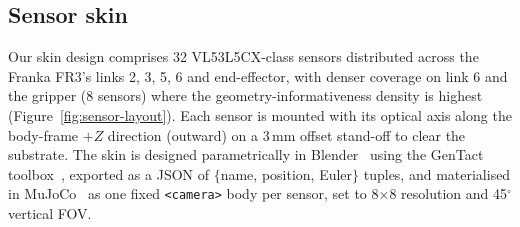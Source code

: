 \documentclass[11pt]{article}
\begin{document}
\subsection{Sensor skin}
\label{sec:system-skin}

Our skin design comprises 32 VL53L5CX-class sensors distributed across
the Franka FR3's links 2, 3, 5, 6 and end-effector, with denser coverage
on link 6 and the gripper (8 sensors) where the geometry-informativeness
density is highest (Figure~\ref{fig:sensor-layout}). Each sensor is
mounted with its optical axis along the body-frame $+Z$ direction
(outward) on a 3\,mm offset stand-off to clear the substrate. The skin
is designed parametrically in Blender~\citep{blender} using the GenTact
toolbox~\citep{patel2023gentact}, exported as a JSON of $\{$name,
position, Euler$\}$ tuples, and materialised in
MuJoCo~\citep{todorov2012mujoco} as one fixed \verb|<camera>| body per
sensor, set to 8$\times$8 resolution and 45$^\circ$ vertical FOV.
\end{document}
